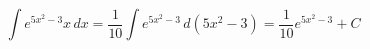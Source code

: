 \documentclass[../rgr1.tex]{subfiles}
\begin{document}
\Solution

\begin{equation}
	\int e^{5x^2-3} x\, dx =
	\frac{1}{10} \int e^{5x^2-3} \, d(5x^2-3) =
	\frac{1}{10} e^{5x^2-3} + C
\end{equation}

\end{document}
